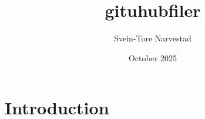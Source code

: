 \documentclass{article}
\title{gituhubfiler}
\author{Svein-Tore Narvestad}
\date{October 2025}
\begin{document}
\maketitle

\section{Introduction}
\end{document}
